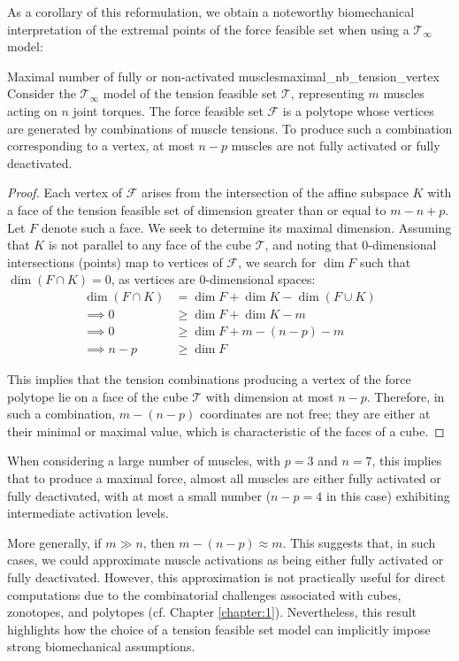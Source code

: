 As a corollary of this reformulation, we obtain a noteworthy biomechanical interpretation of the extremal points of the force feasible set when using a $\mathcal{T}_{\infty}$ model:
\begin{lemmabox}{Maximal number of fully or non-activated muscles}{maximal_nb_tension_vertex}
  Consider the $\mathcal{T}_{\infty}$ model of the tension feasible set $\mathcal{T}$, representing $m$ muscles acting on $n$ joint torques. The force feasible set $\mathcal{F}$ is a polytope whose vertices are generated by combinations of muscle tensions. To produce such a combination corresponding to a vertex, at most $n-p$ muscles are not fully activated or fully deactivated.
\end{lemmabox}
\begin{proof}
  Each vertex of $\mathcal{F}$ arises from the intersection of the affine subspace $K$ with a face of the tension feasible set of dimension greater than or equal to $m-n+p$. Let $F$ denote such a face. We seek to determine its maximal dimension. Assuming that $K$ is not parallel to any face of the cube $\mathcal{T}$, and noting that 0-dimensional intersections (points) map to vertices of $\mathcal{F}$, we search for $\dim F$ such that $\dim (F \cap K) = 0$, as vertices are 0-dimensional spaces:
  \begin{align*}
    \dim (F\cap K) & = \dim F + \dim K - \dim (F\cup K) \\
    \implies 0 &\geq \dim F + \dim K - m \\
    \implies 0 &\geq \dim F + m-(n-p) - m\\
    \implies n-p &\geq \dim F
  \end{align*}

  This implies that the tension combinations producing a vertex of the force polytope lie on a face of the cube $\mathcal{T}$ with dimension at most $n-p$. Therefore, in such a combination, $m-(n-p)$ coordinates are not free; they are either at their minimal or maximal value, which is characteristic of the faces of a cube.
\end{proof}

When considering a large number of muscles, with $p=3$ and $n=7$, this implies that to produce a maximal force, almost all muscles are either fully activated or fully deactivated, with at most a small number ($n-p = 4$ in this case) exhibiting intermediate activation levels.

More generally, if $m \gg n$, then $m - (n - p) \approx m$. This suggests that, in such cases, we could approximate muscle activations as being either fully activated or fully deactivated. However, this approximation is not practically useful for direct computations due to the combinatorial challenges associated with cubes, zonotopes, and polytopes (cf. Chapter \ref{chapter:1}). Nevertheless, this result highlights how the choice of a tension feasible set model can implicitly impose strong biomechanical assumptions. 

